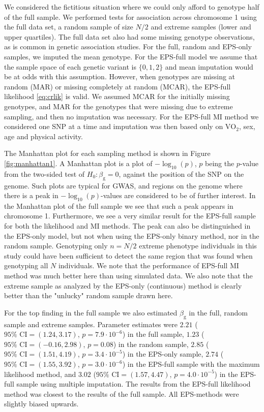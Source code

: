\documentclass[10pt,a4paper]{article}
\begin{document}
We considered the fictitious situation where we could only afford to genotype half of the full sample. We performed tests for association across chromosome 1 using the full data set, a random sample of size $N/2$ and extreme samples (lower and upper quartiles). The full data set also had some missing genotype observations, as is common in genetic association studies. For the full, random and EPS-only samples, we imputed the mean genotype. For the EPS-full model we assume that the sample space of each genetic variant is $\{0,1,2\}$ and mean imputation would be at odds with this assumption. However, when genotypes are missing at random (MAR) or missing completely at random (MCAR), the EPS-full likelihood \eqref{eq:crlik} is valid. We assumed MCAR for the initially missing genotypes, and MAR for the genotypes that were missing due to extreme sampling, and then no imputation was necessary. For the EPS-full MI method we considered one SNP at a time and imputation was then based only on $\text{VO}_2$, sex, age and physical activity. %

The Manhattan plot for each sampling method is shown in Figure \ref{fig:manhattan1}. A Manhattan plot is a plot of $-\log_{10}(p)$, $p$ being the $p$-value from the two-sided test of $H_0: \beta_{\text{g}} = 0$, against the position of the SNP on the genome. Such plots are typical for GWAS, and regions on the genome where there is a peak in $-\log_{10}(p)$-values are considered to be of further interest. In the Manhattan plot of the full sample we see that such a peak appears in chromosome 1. Furthermore, we see a very similar result for the EPS-full sample for both the likelihood and MI methods. The peak can also be distinguished in the EPS-only model, but not when using the EPS-only binary method, nor in the random sample. Genotyping only $n = N/2$ extreme phenotype individuals in this study could have been sufficient to detect the same region that was found when genotyping all $N$ individuals. We note that the performance of EPS-full MI method was much better here than using simulated data. We also note that the extreme sample as analyzed by the EPS-only (continuous) method is clearly better than the "unlucky" random sample drawn here.

For the top finding in the full sample we also estimated $\beta_{\text{g}}$ in the full, random sample and extreme samples. Parameter estimates were $2.21$ ($95\% \text{ CI} = (1.24,3.17)$, $p = 7.9 \cdot 10^{-6}$) in the full sample, $1.23$ ($95\% \text{ CI} = (-0.16,2.98)$, $p = 0.08$) in the random sample, $2.85$ ($95\% \text{ CI} = (1.51,4.19)$, $p = 3.4 \cdot 10^{-5}$) in the EPS-only sample, $2.74$ ($95\% \text{ CI} = (1.55,3.92)$, $p = 3.0 \cdot 10^{-6}$) in the EPS-full sample with the maximum likelihood method, and $3.02$ ($95\% \text{ CI} = (1.57,4.47)$, $p = 4.0 \cdot 10^{-5}$) in the EPS-full sample using multiple imputation. The results from the EPS-full likelihood method was closest to the results of the full sample. All EPS-methods were slightly biased upwards.
\end{document}
